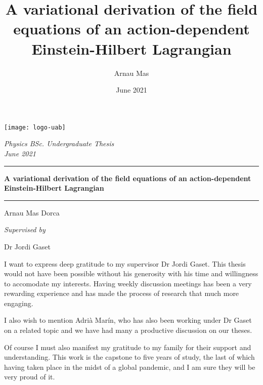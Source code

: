 \documentclass[12pt, oneside]{book}
\title{A variational derivation of the field equations of an action-dependent
	Einstein-Hilbert Lagrangian}
\author{Arnau Mas}
\date{June 2021}
\begin{document}
\begin{titlepage}
	\centering \sffamily

	\vspace*{2cm}

	\texttt{[image: logo-uab]}

	\vspace{2cm}

	{\Large \itshape Physics BSc. Undergraduate Thesis} \\
	{\large \itshape June 2021}

	\vspace{10pt}
	\hrule
	\vspace{10pt}
	{\bfseries \Large A variational derivation of the field equations of an action-dependent
	Einstein-Hilbert Lagrangian}

	\vspace{10pt}
	\hrule		
	\vspace{2cm}

	{\Large Arnau Mas Dorca}

	\vspace{1cm}
	{\large \itshape Supervised by}

	{\Large Dr Jordi Gaset}
\end{titlepage}

% 

\pagestyle{plain}
\frontmatter
\hspace{0pt}
\vfill

\begin{itshape}
	I want to express deep gratitude to my supervisor Dr Jordi Gaset. This thesis would not
	have been possible without his generosity with his time and willingness to accomodate
	my interests. Having weekly discussion meetings has been a very rewarding experience and
	has made the process of research that much more engaging. 

	I also wish to mention Adrià Marín, who has also been working under Dr Gaset on a
	related topic and we have had many a productive discussion on our theses. 

	Of course I must also manifest my gratitude to my family for their support and
	understanding. This work is the capstone to five years of study, the last of which
	having taken place in the midst of a global pandemic, and I am sure they will be very
	proud of it. 
\end{itshape}

\vfill
\hspace{0pt}
\end{document}

